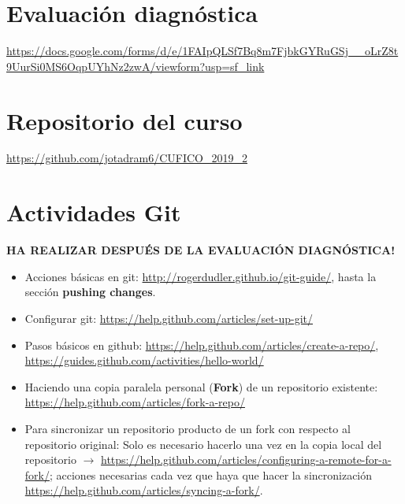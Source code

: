 \documentclass[10.5pt]{article}
\begin{document}
\section{Evaluación diagnóstica}

\url{https://docs.google.com/forms/d/e/1FAIpQLSf7Bq8m7FjbkGYRuGSj__oLrZ8t9UurSi0MS6OqpUYhNz2zwA/viewform?usp=sf_link}

\section{Repositorio del curso}

\url{https://github.com/jotadram6/CUFICO_2019_2}

\section{Actividades Git}

{\textbf{HA REALIZAR DESPUÉS DE LA EVALUACIÓN DIAGNÓSTICA!}}

\begin{itemize}
\item Acciones básicas en git: \url{http://rogerdudler.github.io/git-guide/}, hasta la sección {\textbf{pushing changes}}.
\item Configurar git: \url{https://help.github.com/articles/set-up-git/}
\item Pasos básicos en github: \url{https://help.github.com/articles/create-a-repo/}, \url{https://guides.github.com/activities/hello-world/}
\item Haciendo una copia paralela personal ({\textbf{Fork}}) de un repositorio existente: \url{https://help.github.com/articles/fork-a-repo/}
\item Para sincronizar un repositorio producto de un fork con respecto al repositorio original: Solo es necesario hacerlo una vez en la copia local del repositorio $\rightarrow$ \url{https://help.github.com/articles/configuring-a-remote-for-a-fork/}; acciones necesarias cada vez que haya que hacer la sincronización \url{https://help.github.com/articles/syncing-a-fork/}.
\end{itemize}
\end{document}
